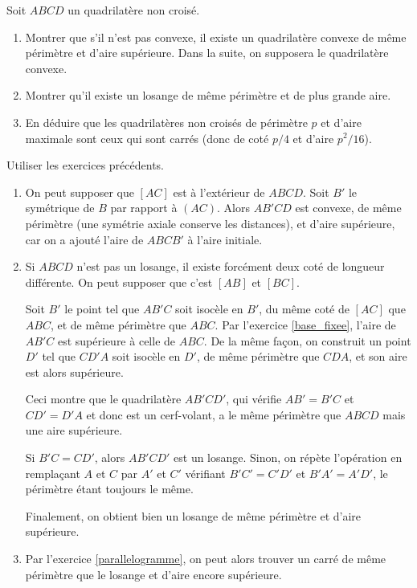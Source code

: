 \begin{exo}
\label{quadrilateres}
Soit $ABCD$ un quadrilatère non croisé.
\begin{enumerate}
\item Montrer que s'il n'est pas convexe, il existe un quadrilatère convexe de même périmètre et d'aire supérieure. Dans la suite, on supposera le quadrilatère convexe.
\item Montrer qu'il existe un losange de même périmètre et de plus grande aire.
\item En déduire que les quadrilatères non croisés de périmètre $p$ et d'aire maximale sont ceux qui sont carrés (donc de coté $p/4$ et d'aire $p^2/16$).
\end{enumerate}
\begin{hint}
Utiliser les exercices précédents.
\end{hint}
\begin{sol}
\begin{enumerate}
\item On peut supposer que $[AC]$ est à l'extérieur de $ABCD$. Soit $B'$ le symétrique de $B$ par rapport à $(AC)$. Alors $AB'CD$ est convexe, de même périmètre (une symétrie axiale conserve les distances), et d'aire supérieure, car on a ajouté l'aire de $ABCB'$ à l'aire initiale.
\item Si $ABCD$ n'est pas un losange, il existe forcément deux coté de longueur différente. On peut supposer que c'est $[AB]$ et $[BC]$.

Soit $B'$ le point tel que $AB'C$ soit isocèle en $B'$, du même coté de $[AC]$ que $ABC$, et de même périmètre que $ABC$. Par l'exercice \ref{base_fixee}, l'aire de $AB'C$ est supérieure à celle de $ABC$. De la même façon, on construit un point $D'$ tel que $CD'A$ soit isocèle en $D'$, de même périmètre que $CDA$, et son aire est alors supérieure.

Ceci montre que le quadrilatère $AB'CD'$, qui vérifie $AB'=B'C$ et $CD'=D'A$ et donc est un cerf-volant, a le même périmètre que $ABCD$ mais une aire supérieure.

Si $B'C=CD'$, alors $AB'CD'$ est un losange. Sinon, on répète l'opération en remplaçant $A$ et $C$ par $A'$ et $C'$ vérifiant $B'C'=C'D'$ et $B'A'=A'D'$, le périmètre étant toujours le même.

Finalement, on obtient bien un losange de même périmètre et d'aire supérieure.

\item Par l'exercice \ref{parallelogramme}, on peut alors trouver un carré de même périmètre que le losange et d'aire encore supérieure.
\end{enumerate}
\end{sol}
\end{exo}

